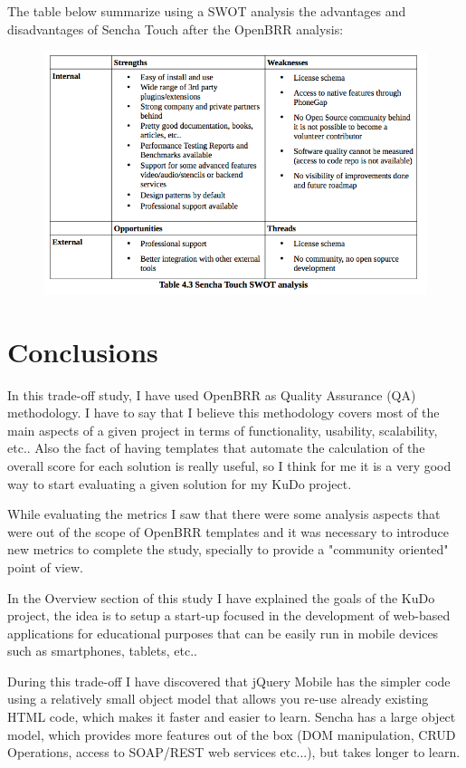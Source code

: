 \documentclass[a4paper,12pt]{book}
\begin{document}
The table below summarize using a SWOT analysis the advantages and disadvantages of Sencha Touch after the OpenBRR analysis:

\begin{figure}[H]
    \centering
    \includegraphics[width=12cm, keepaspectratio]{img/table43.png}
 \end{figure}


\chapter{Conclusions}
\label{chap:conclusions}

In this trade-off study, I have used OpenBRR as Quality Assurance (QA) methodology. I have to say that I believe this methodology covers most of the main aspects of a given project in terms of functionality, usability, scalability, etc.. Also the fact of having templates that automate the calculation of the overall score for each solution is really useful, so I think for me it is a very good way to start evaluating a given solution for my KuDo project.

While evaluating the metrics I saw that there were some analysis aspects that were out of the scope of OpenBRR templates and it was necessary to introduce new metrics to complete the study, specially to provide a "community oriented" point of view.

In the Overview section of this study I have explained the goals of the KuDo project, the idea is to setup a start-up focused in the development of web-based applications for educational purposes that can be easily run in mobile devices such as smartphones, tablets, etc..

During this trade-off I have discovered that jQuery Mobile has the simpler code using a relatively small object model that allows you re-use already existing HTML code, which makes it faster and easier to learn. Sencha has a large object model, which provides more features out of the box (DOM manipulation, CRUD Operations, access to SOAP/REST web services etc...), but takes longer to learn.
\end{document}
